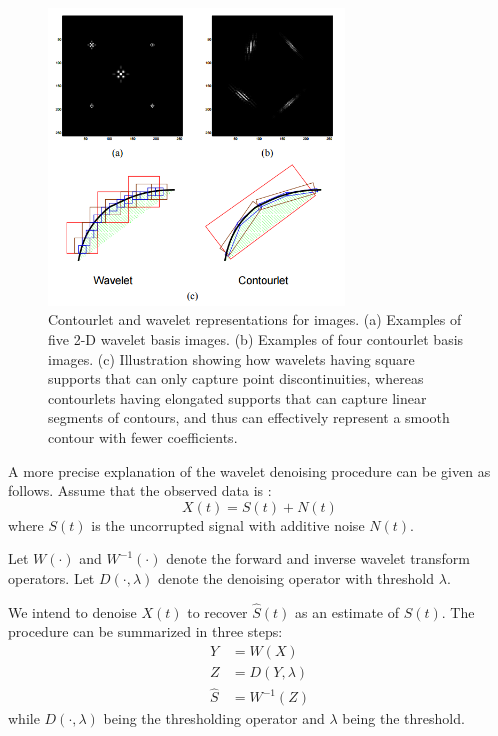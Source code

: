 \begin{figure}[h]
	\centering
	\includegraphics[width=0.7\textwidth]{fig/wavelets_contourlet}
	\caption{Contourlet and wavelet representations for images. (a) Examples of
		five 2-D wavelet basis images. (b) Examples of four contourlet basis images.
		(c) Illustration showing how wavelets having square supports that can only
		capture point discontinuities, whereas contourlets having elongated supports
		that can capture linear segments of contours, and thus can effectively represent
		a smooth contour with fewer coefficients.
	}
	\label{fig:wavelets_contourlet}
	
\end{figure}

A more precise explanation of the wavelet denoising
procedure can be given as follows. Assume that the
observed data is \cite{rangarajan2002image}:
\begin{equation}
X(t)=S(t)+N(t)
\end{equation}
where $S(t)$ is the uncorrupted signal with additive
noise $N(t)$. 

Let $W(\cdot)$ and $W^{-1}(\cdot)$ denote the forward
and inverse wavelet transform operators. Let $D(\cdot, \lambda)$ denote the denoising operator with threshold $\lambda$. 

We intend to denoise $X(t)$ to recover $\hat{S}(t)$ as an estimate
of $S(t)$. The procedure can be summarized in three
steps:
\begin{subequations}
	\begin{align}
	Y &= W(X)\\
	Z &= D(Y,\lambda)\\
	\hat{S} &= W^{-1}(Z)
	\end{align}
	\label{eqn:wavelet_denoise}
\end{subequations}
while $D(\cdot,\lambda)$ being the thresholding operator and $\lambda$ being the threshold.

